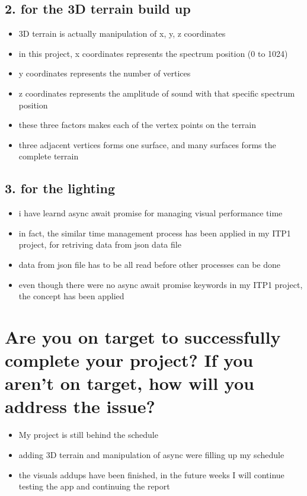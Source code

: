 \subsection*{2. for the 3D terrain build up}

\begin{itemize}
  \item 3D terrain is actually manipulation of x, y, z coordinates
  \item in this project, x coordinates represents the spectrum position (0 to 1024)
  \item y coordinates represents the number of vertices
  \item z coordinates represents the amplitude of sound with that specific spectrum position
  \item these three factors makes each of the vertex points on the terrain
  \item three adjacent vertices forms one surface, and many surfaces forms the complete terrain
\end{itemize}

\subsection*{3. for the lighting}

\begin{itemize}
  \item i have learnd async await promise for managing visual performance time
  \item in fact, the similar time management process has been applied in my ITP1 project, for retriving data from json data file
  \item data from json file has to be all read before other processes can be done
  \item even though there were no async await promise keywords in my ITP1 project, the concept has been applied
\end{itemize}

\section*{Are you on target to successfully complete your project? If you aren’t on target, how will you address the issue?}

\begin{itemize}
  \item My project is still behind the schedule
  \item adding 3D terrain and manipulation of async were filling up my schedule
  \item the visuals addups have been finished, in the future weeks I will continue testing the app and continuing the report
\end{itemize}

